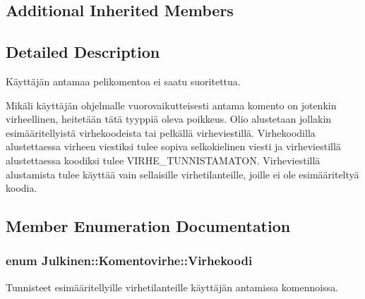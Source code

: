 \subsection*{Additional Inherited Members}


\subsection{Detailed Description}
Käyttäjän antamaa pelikomentoa ei saatu suoritettua. 

Mikäli käyttäjän ohjelmalle vuorovaikutteisesti antama komento on jotenkin virheellinen, heitetään tätä tyyppiä oleva poikkeus. Olio alustetaan jollakin esimääritellyistä virhekoodeista tai pelkällä virheviestillä. Virhekoodilla alustettaessa virheen viestiksi tulee sopiva selkokielinen viesti ja virheviestillä alustettaessa koodiksi tulee V\+I\+R\+H\+E\+\_\+\+T\+U\+N\+N\+I\+S\+T\+A\+M\+A\+T\+O\+N. Virheviestillä alustamista tulee käyttää vain sellaisille virhetilanteille, joille ei ole esimääriteltyä koodia. 

\subsection{Member Enumeration Documentation}
\hypertarget{class_julkinen_1_1_komentovirhe_ad45b4895d16e53f115875f2e2a1518e3}{}
\subsubsection[{Virhekoodi}]{\setlength{\rightskip}{0pt plus 5cm}enum {\bf Julkinen\+::\+Komentovirhe\+::\+Virhekoodi}}\label{class_julkinen_1_1_komentovirhe_ad45b4895d16e53f115875f2e2a1518e3}


Tunnisteet esimääritellyille virhetilanteille käyttäjän antamissa komennoissa. 

